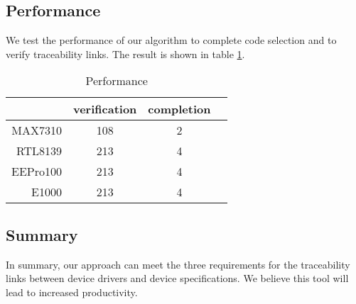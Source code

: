 \subsection{Performance}

We test the performance of our algorithm to complete code selection and to verify traceability links. The result is shown in table \ref{table:performance}.

\begin{table}[th]
\caption{Performance}
\centering
\begin{tabular*}{0.6\textwidth}{@{\extracolsep{\fill}}rccc}
\hline
 & verification & completion\\
\hline
MAX7310 & 108 & 2 \\
RTL8139  & 213 & 4\\
EEPro100  & 213 & 4\\
E1000  & 213 & 4\\
\hline
\end{tabular*}
\label{table:performance}
\end{table}


\subsection{Summary}

In summary, our approach can meet the three requirements for the traceability links between device drivers and device specifications.
We believe this tool will lead to increased productivity.
